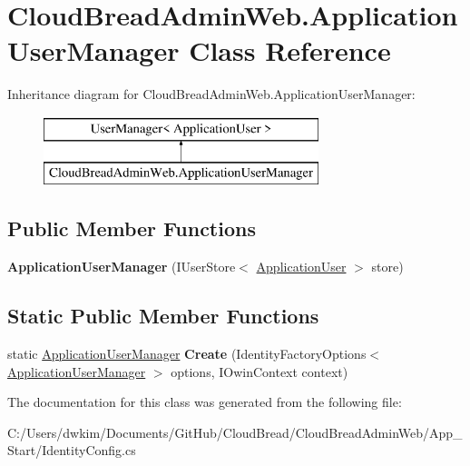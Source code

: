 \hypertarget{class_cloud_bread_admin_web_1_1_application_user_manager}{}\section{Cloud\+Bread\+Admin\+Web.\+Application\+User\+Manager Class Reference}
\label{class_cloud_bread_admin_web_1_1_application_user_manager}
Inheritance diagram for Cloud\+Bread\+Admin\+Web.\+Application\+User\+Manager\+:\begin{figure}[H]
\begin{center}
\leavevmode
\includegraphics[height=2.000000cm]{class_cloud_bread_admin_web_1_1_application_user_manager}
\end{center}
\end{figure}
\subsection*{Public Member Functions}
\begin{DoxyCompactItemize}
\item 
{\bfseries Application\+User\+Manager} (I\+User\+Store$<$ \hyperlink{class_cloud_bread_admin_web_1_1_models_1_1_application_user}{Application\+User} $>$ store)\hypertarget{class_cloud_bread_admin_web_1_1_application_user_manager_ac64e803f424ca85090b245bcf18ec514}{}\label{class_cloud_bread_admin_web_1_1_application_user_manager_ac64e803f424ca85090b245bcf18ec514}

\end{DoxyCompactItemize}
\subsection*{Static Public Member Functions}
\begin{DoxyCompactItemize}
\item 
static \hyperlink{class_cloud_bread_admin_web_1_1_application_user_manager}{Application\+User\+Manager} {\bfseries Create} (Identity\+Factory\+Options$<$ \hyperlink{class_cloud_bread_admin_web_1_1_application_user_manager}{Application\+User\+Manager} $>$ options, I\+Owin\+Context context)\hypertarget{class_cloud_bread_admin_web_1_1_application_user_manager_ae2188287f4231a9b68f1204a634e97fd}{}\label{class_cloud_bread_admin_web_1_1_application_user_manager_ae2188287f4231a9b68f1204a634e97fd}

\end{DoxyCompactItemize}


The documentation for this class was generated from the following file\+:\begin{DoxyCompactItemize}
\item 
C\+:/\+Users/dwkim/\+Documents/\+Git\+Hub/\+Cloud\+Bread/\+Cloud\+Bread\+Admin\+Web/\+App\+\_\+\+Start/Identity\+Config.\+cs\end{DoxyCompactItemize}
